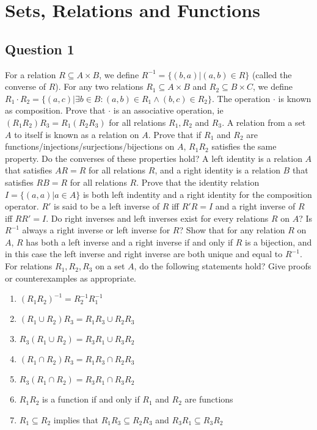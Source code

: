 \documentclass[12pt]{report}
\begin{document}
\chapter{Sets, Relations and Functions}
\section*{Question 1}
For a relation $R \subseteq A \times B$, we define $R^{-1} = \{(b, a) | (a, b) \in R\}$ (called the converse of $R$). For any two relations $R_{1} \subseteq A \times B$ and $R_{2} \subseteq B \times C$, we define $R_{1} \cdot R_{2} = \{(a, c) | \exists b \in B: (a, b) \in R_{1} \land (b, c) \in R_{2}\}$. The operation $\cdot$ is known as composition. Prove that $\cdot$ is an associative operation, ie $(R_{1}R_{2})R_{3} = R_{1}(R_{2}R_{3})$ for all relations $R_{1}, R_{2}$ and $R_{3}$. A relation from a set $A$ to itself is known as a relation on $A$. Prove that if $R_{1}$ and $R_{2}$ are functions/injections/surjections/bijections on $A$, $R_{1}R_{2}$ satisfies the same property. Do the converses of these properties hold? A left identity is a relation $A$ that satisfies $AR = R$ for all relations $R$, and a right identity is a relation $B$ that satisfies $RB = R$ for all relations $R$. Prove that the identity relation $I = \{(a, a) | a \in A\}$ is both left indentity and a right identity for the composition operator. $R'$ is said to be a left inverse of $R$ iff $R'R = I$ and a right inverse of $R$ iff $RR' = I$. Do right inverses and left inverses exist for every relations $R$ on $A$? Is $R^{-1}$ always a right inverse or left inverse for $R$? Show that for any relation $R$ on $A$, $R$ has both a left inverse and a right inverse if and only if $R$ is a bijection, and in this case the left inverse and right inverse are both unique and equal to $R^{-1}$. For relations $R_{1}, R_{2}, R_{3}$ on a set $A$, do the following statements hold? Give proofs or counterexamples as appropriate.
\begin{enumerate}
  \item $(R_{1}R_{2})^{-1} = R_{2}^{-1}R_{1}^{-1}$
  \item $(R_{1} \cup R_{2})R_{3} = R_{1}R_{3} \cup R_{2}R_{3}$
  \item $R_{3}(R_{1} \cup R_{2}) = R_{3}R_{1} \cup R_{3}R_{2}$
  \item $(R_{1} \cap R_{2})R_{3} = R_{1}R_{3} \cap R_{2}R_{3}$
  \item $R_{3}(R_{1} \cap R_{2}) = R_{3}R_{1} \cap R_{3}R_{2}$
  \item $R_{1}R_{2}$ is a function if and only if $R_{1}$ and $R_{2}$ are functions
  \item $R_{1} \subseteq R_{2}$ implies that $R_{1}R_{3} \subseteq R_{2}R_{3}$ and $R_{3}R_{1} \subseteq R_{3}R_{2}$
\end{enumerate}
\end{document}
